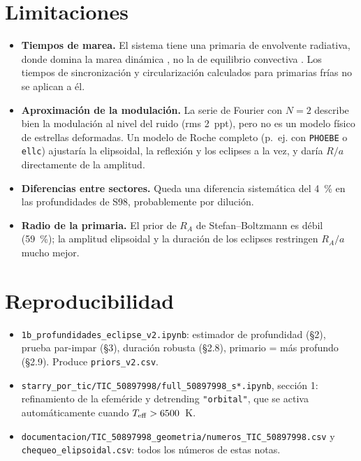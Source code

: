 \documentclass[11pt,a4paper]{article}
\newcommand{\teff}{T_{\rm eff}}
\begin{document}
\section{Limitaciones}
\begin{itemize}
\item \textbf{Tiempos de marea.} El sistema tiene una primaria de envolvente radiativa, donde domina la
  marea dinámica \citep{Zahn1975}, no la de equilibrio convectiva \citep{Zahn1977,Hut1981}. Los tiempos
  de sincronización y circularización calculados para primarias frías no se aplican a él.
\item \textbf{Aproximación de la modulación.} La serie de Fourier con $N=2$ describe bien la
  modulación al nivel del ruido (rms 2~ppt), pero no es un modelo físico de estrellas deformadas. Un
  modelo de Roche completo (p.~ej. con \texttt{PHOEBE} o \texttt{ellc}) ajustaría la elipsoidal, la
  reflexión y los eclipses a la vez, y daría $R/a$ directamente de la amplitud.
\item \textbf{Diferencias entre sectores.} Queda una diferencia sistemática del 4~\% en las
  profundidades de S98, probablemente por dilución.
\item \textbf{Radio de la primaria.} El prior de $R_A$ de Stefan--Boltzmann es débil (59~\%); la amplitud
  elipsoidal y la duración de los eclipses restringen $R_A/a$ mucho mejor.
\end{itemize}

\section{Reproducibilidad}
\begin{itemize}
\item \texttt{1b\_profundidades\_eclipse\_v2.ipynb}: estimador de profundidad (§2), prueba par-impar (§3),
  duración robusta (§2.8), primario = más profundo (§2.9). Produce \texttt{priors\_v2.csv}.
\item \texttt{starry\_por\_tic/TIC\_50897998/full\_50897998\_s*.ipynb}, sección 1: refinamiento de la
  efeméride y detrending \texttt{"orbital"}, que se activa automáticamente cuando $\teff>6500$~K.
\item \texttt{documentacion/TIC\_50897998\_geometria/numeros\_TIC\_50897998.csv} y
  \texttt{chequeo\_elipsoidal.csv}: todos los números de estas notas.
\end{itemize}
\end{document}
